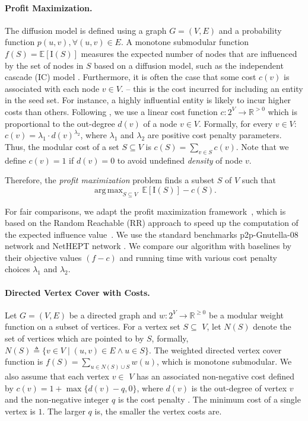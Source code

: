 \documentclass[10pt]{article} %
\DeclareMathOperator*{\argmax}{arg\,max}
\theoremstyle{remark}
\begin{document}
\paragraph{\bf Profit Maximization.} The diffusion model \cite{kempe2003maximizing} is defined using a graph $G=(V,E)$ and a probability function $p(u,v), \forall (u,v)\in E$.   
A monotone submodular function $f(S) = \mathbb{E}[\mathrm{I}(S)]$ measures the expected number of nodes that are influenced by the set of nodes in $S$ based on a diffusion model, such as the independent cascade (IC) model \cite{kempe2003maximizing}. 
Furthermore, it is often the case that some cost $c(v)$ is associated with each node $v \in V$.
-- this is the cost incurred for including an entity in the seed
set. For instance, a highly influential entity is likely to incur higher costs than others.
Following \cite{jin2021unconstrained, tang2018towards}, we use a linear cost function $c:2^V \rightarrow \mathbb{R}^{>0}$ which is proportional to the out-degree $d(v)$ of a node $v \in V$. Formally, for every $v \in V$:
$c(v) = \lambda_1 \cdot d(v)^{\lambda_2}$, where $\lambda_1$ and $\lambda_2$ are positive cost penalty parameters. Thus, the modular cost of a set $S \subseteq V$ is $c(S)=\sum_{v\in S}c(v)$.  Note that we define $c(v)=1$ if $d(v)=0$ to avoid undefined {\em density} of node $v$.

Therefore, the {\em profit maximization} problem finds a subset $S$ of $V$ such that 
\[\argmax_{S\subseteq V} ~\mathbb{E}[\mathrm{I}(S)]-c(S).\]

For fair comparisons, we adapt the profit maximization  framework~\cite{jin2021unconstrained}, which is based on the Random Reachable (RR) approach to speed up the computation of the expected influence value~\cite{borgs2014maximizing,TangXS14,TangSX15,NguyenTD16,HuangWBXL17}. We use the standard benchmarks p2p-Gnutella-08 network \cite{leskovec2007graph} and NetHEPT network \cite{chen2009efficient}. 
We compare our algorithm with baselines by their objective values $(f-c)$ and running time with various cost penalty choices $\lambda_1$ and $\lambda_2$.


\paragraph{\bf Directed Vertex Cover with Costs. }
Let $G=(V, E)$ be a directed graph and $w: 2^V \rightarrow \mathbb{R}^{\geq 0}$ be a modular weight function on a subset of vertices. For a vertex set $S \subseteq$ $V$, let $N(S)$ denote the set of vertices which are pointed to by $S$, formally,
$N(S) \triangleq\{v \in V \mid(u, v) \in E \wedge u \in S\}$. The weighted directed vertex cover function is $f(S)=\sum_{u \in N(S) \cup S} w(u)$, which is monotone submodular. We also assume that each vertex $v \in$ $V$ has an associated non-negative cost defined by $c(v)=1+\max \{d(v)-q, 0\}$, where $d(v)$ is the out-degree of vertex $v$ and the non-negative integer $q$ is the cost penalty \cite{harshaw2019submodular}. The minimum cost of a single vertex is $1$. The larger $q$ is, the smaller the vertex costs are. 
\end{document}
